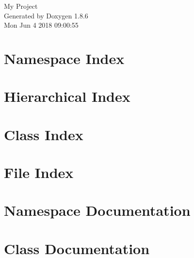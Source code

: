 \documentclass[twoside]{book}
\newcommand{\clearemptydoublepage}{%
  \newpage{\pagestyle{empty}\cleardoublepage}%
}
\begin{document}
\hypersetup{pageanchor=false}
\begin{titlepage}
\vspace*{7cm}
\begin{center}%
{\Large My Project }\\
\vspace*{1cm}
{\large Generated by Doxygen 1.8.6}\\
\vspace*{0.5cm}
{\small Mon Jun 4 2018 09:00:55}\\
\end{center}
\end{titlepage}
\clearemptydoublepage
\tableofcontents
\clearemptydoublepage
{}
\hypersetup{pageanchor=true}

\chapter{Namespace Index}

\chapter{Hierarchical Index}

\chapter{Class Index}

\chapter{File Index}

\chapter{Namespace Documentation}


\chapter{Class Documentation}















\end{document}
